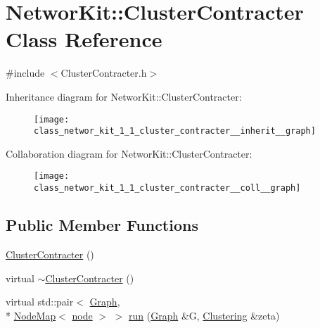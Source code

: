 \hypertarget{class_networ_kit_1_1_cluster_contracter}{\section{Networ\-Kit\-:\-:Cluster\-Contracter Class Reference}
\label{class_networ_kit_1_1_cluster_contracter}
}


{\ttfamily \#include $<$Cluster\-Contracter.\-h$>$}



Inheritance diagram for Networ\-Kit\-:\-:Cluster\-Contracter\-:\nopagebreak
\begin{figure}[H]
\begin{center}
\leavevmode
\texttt{[image: class\_networ\_kit\_1\_1\_cluster\_contracter\_\_inherit\_\_graph]}
\end{center}
\end{figure}


Collaboration diagram for Networ\-Kit\-:\-:Cluster\-Contracter\-:\nopagebreak
\begin{figure}[H]
\begin{center}
\leavevmode
\texttt{[image: class\_networ\_kit\_1\_1\_cluster\_contracter\_\_coll\_\_graph]}
\end{center}
\end{figure}
\subsection*{Public Member Functions}
\begin{DoxyCompactItemize}
\item 
\hyperlink{class_networ_kit_1_1_cluster_contracter_a13748f7b5d25ee9bcba235bd4537f301}{Cluster\-Contracter} ()
\item 
virtual \hyperlink{class_networ_kit_1_1_cluster_contracter_aa4533476cd0c57e685ae423acb6f8b33}{$\sim$\-Cluster\-Contracter} ()
\item 
virtual std\-::pair$<$ \hyperlink{class_networ_kit_1_1_graph}{Graph}, \\*
\hyperlink{class_networ_kit_1_1_node_map}{Node\-Map}$<$ \hyperlink{namespace_networ_kit_a53fe3e4fd04ea024160e4d024dfebadf}{node} $>$ $>$ \hyperlink{class_networ_kit_1_1_cluster_contracter_a9e0d1a9207829df868b163b95cba85ca}{run} (\hyperlink{class_networ_kit_1_1_graph}{Graph} \&G, \hyperlink{class_networ_kit_1_1_clustering}{Clustering} \&zeta)
\end{DoxyCompactItemize}


